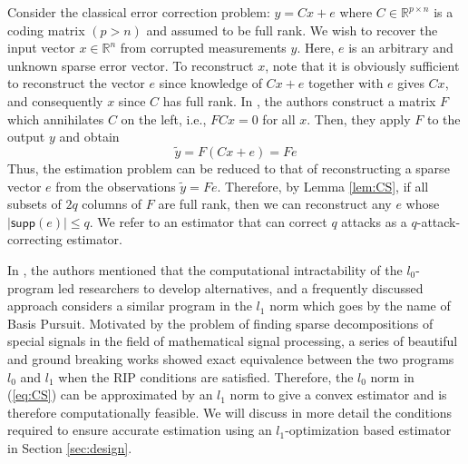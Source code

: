 \documentclass[../../thesis.tex]{subfiles}
\newcommand{\norm}[1]{\left\lVert#1\right\rVert}
\begin{document}
%
Consider the classical error correction problem: $y=Cx + e$ where $C\in \mathbb{R}^{p\times n}$ is a coding matrix $(p > n)$ and assumed to be full rank. We wish to recover the input vector $x \in \mathbb{R}^n$ from corrupted measurements $y$. Here, $e$ is an arbitrary and unknown sparse error vector. To reconstruct $x$, note that it is obviously sufficient to reconstruct the vector $e$ since knowledge of $Cx + e$ together with $e$ gives $Cx$, and consequently $x$ since $C$ has full rank. In \cite{tao11}, the authors construct a matrix $F$ which annihilates $C$ on the left, i.e.,  $FCx = 0$ for all $x$. Then, they apply $F$ to the output $y$ and obtain
\begin{equation}
	\tilde y = F (Cx + e) = Fe 
\end{equation}
Thus, the estimation problem can be reduced to that of reconstructing a sparse vector $e$ from the observations $\tilde y = Fe$. Therefore, by Lemma \ref{lem:CS}, if all subsets of $2q$ columns of $F$ are full rank, then we can reconstruct any $e$ whose  $\lvert \textsf{supp}(e) \rvert \le q$. We refer to an estimator that can correct $q$ attacks as a $q$-attack-correcting estimator.

In \cite{tao11}, the authors mentioned that the computational intractability of the $l_0$-program led researchers to develop alternatives, and a frequently discussed approach considers a similar program in the $l_1$ norm which goes by the name of Basis Pursuit. Motivated by the problem of finding sparse decompositions of special signals in the field of mathematical signal processing, a series of beautiful and ground breaking works \cite{Donoho2003, Elad2002, Gribonval11, Tropp2004} showed exact equivalence between the two programs $l_0$ and $l_1$ when the RIP conditions are satisfied. Therefore, the $l_0$ norm in (\ref{eq:CS}) can be approximated by an $l_1$ norm to give a convex estimator and is therefore computationally feasible. 
We will discuss in more detail the conditions required to ensure accurate estimation using an $l_1$-optimization based estimator in Section \ref{sec:design}. 
\end{document}
